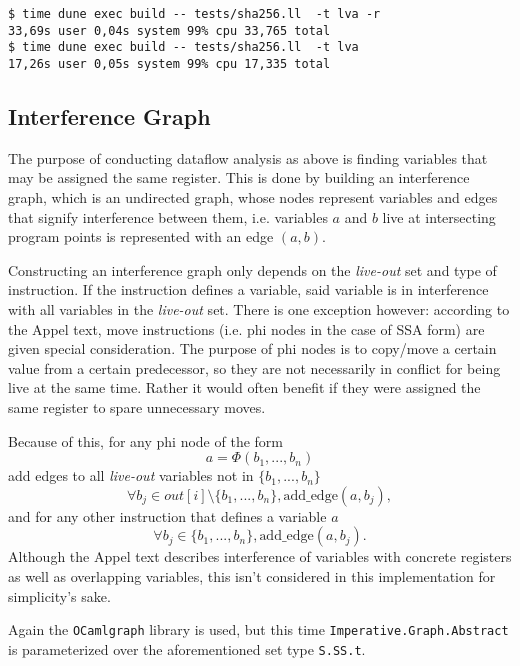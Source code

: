 \documentclass{article}
\begin{document}
\begin{verbatim}
$ time dune exec build -- tests/sha256.ll  -t lva -r
33,69s user 0,04s system 99% cpu 33,765 total
$ time dune exec build -- tests/sha256.ll  -t lva
17,26s user 0,05s system 99% cpu 17,335 total
\end{verbatim}


\subsection{Interference Graph}

The purpose of conducting dataflow analysis as above is finding variables that may be assigned the same register. This is done by building an interference graph, which is an undirected graph, whose nodes represent variables and edges that signify interference between them, i.e. variables \(a\) and \(b\) live at intersecting program points is represented with an edge \((a,b)\).


Constructing an interference graph only depends on the \textit{live-out} set and type of instruction. If the instruction defines a variable, said variable is in interference with all variables in the \textit{live-out} set. There is one exception however: according to the Appel text, move instructions (i.e. phi nodes in the case of SSA form) are given special consideration. The purpose of phi nodes is to copy/move a certain value from a certain predecessor, so they are not necessarily in conflict for being live at the same time. Rather it would often benefit if they were assigned the same register to spare unnecessary moves. %


Because of this, for any phi node of the form 
\begin{equation}
  a = \Phi (b_1, ..., b_n) \label{phi}
\end{equation}
add edges to all \textit{live-out} variables not in \(\{b_1, ..., b_n\}\)
\[
  \forall b_j \in \mathit{out}[i] \setminus \{b_1, ..., b_n\}, \text{add\_edge}(a, b_j),
\]
and for any other instruction that defines a variable \(a\)
\[
  \forall b_j \in \{b_1, ..., b_n\}, \text{add\_edge}(a, b_j).
\]
Although the Appel text \cite{tiger} describes interference of variables with concrete registers as well as overlapping variables, this isn't considered in this implementation %
for simplicity's sake.

Again the \texttt{OCamlgraph} library is used, but this time \texttt{Imperative.Graph.Abstract} is parameterized over the aforementioned set type \texttt{S.SS.t}. %
\end{document}
